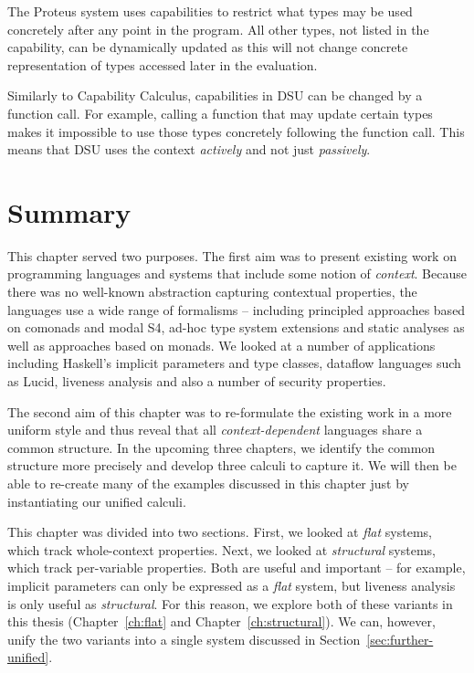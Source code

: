 The Proteus system uses capabilities to restrict what types may be used concretely after any point
in the program. All other types, not listed in the capability, can be dynamically updated as this
will not change concrete representation of types accessed later in the evaluation.

Similarly to Capability Calculus, capabilities in DSU can be changed by a function call. For
example, calling a function that may update certain types makes it impossible to use those types
concretely following the function call. This means that DSU uses the context \emph{actively}
and not just \emph{passively}.


%
%

\section{Summary}

This chapter served two purposes. The first aim was to present existing work on programming
languages and systems that include some notion of \emph{context}. Because there was no well-known
abstraction capturing contextual properties, the languages use a wide range of formalisms -- including
principled approaches based on comonads and modal S4, ad-hoc type system extensions and static analyses
as well as approaches based on monads. We looked at a number of applications including Haskell's implicit
parameters and type classes, dataflow languages such as Lucid, liveness analysis and also a number of
security properties.

The second aim of this chapter was to re-formulate the existing work in a more uniform style and thus
reveal that all \emph{context-dependent} languages share a common structure. In the upcoming three
chapters, we identify the common structure more precisely and develop three calculi to capture it. We
will then be able to re-create many of the examples discussed in this chapter just by instantiating our
unified calculi.

This chapter was divided into two sections. First, we looked at \emph{flat} systems, which
track whole-context properties. Next, we looked at \emph{structural} systems, which track per-variable
properties. Both are useful and important -- for example, implicit parameters can
only be expressed as a \emph{flat} system, but liveness analysis is only useful as \emph{structural}.
For this reason, we explore both of these variants in this thesis (Chapter~\ref{ch:flat} and
Chapter~\ref{ch:structural}). We can, however, unify the two variants into a single
system discussed in Section~\ref{sec:further-unified}.

